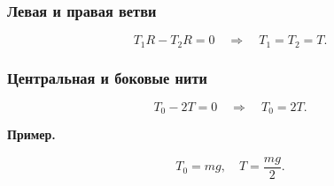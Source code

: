 \documentclass[12pt, a4paper]{article}
\begin{document}
\subsubsection*{Левая и правая ветви}

\[
T_1R - T_2R = 0
\quad\Longrightarrow\quad
T_1 = T_2 = T.
\]

\subsubsection*{Центральная и боковые нити}

\[
T_0 - 2T = 0
\quad\Longrightarrow\quad
T_0 = 2T.
\]

\textbf{Пример.} 

\[
T_0 = mg,
\quad
T = \frac{mg}{2}.
\]
\end{document}
